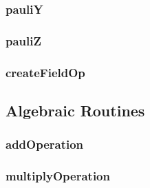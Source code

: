 \documentclass[10pt]{book}
\begin{document}
\subsubsection{\textbf{pauliY}}\label{subsec:pauliy}


\subsubsection{\textbf{pauliZ}}\label{subsec:pauliz}


\subsubsection{\textbf{createFieldOp}}\label{subsec:createfieldop}



\subsection{Algebraic Routines}
\subsubsection{\textbf{addOperation}}\label{subsec:addop}


\subsubsection{\textbf{multiplyOperation}}\label{subsec:mulop}


% 


\clearpage




\end{document}
